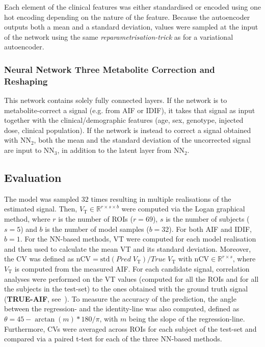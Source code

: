                 Each element of the clinical features was either standardised or encoded using one hot encoding depending on the nature of the feature. Because the autoencoder outputs both a mean and a standard deviation, values were sampled at the input of the network using the same \textit{reparametrisation-trick} as for a variational autoencoder.
            \subsubsection{Neural Network Three Metabolite Correction and Reshaping} \label{sec:a_bayesian_neural_network-based_method_for_the_extraction_of_a_metabolite_corrected_arterial_input_function_from_dynamic_pbr28_pet_appendix_methods_neural_network_design_neural_network_three_metabolite_correction_and_reshaping}
                This network contains solely fully connected layers. If the network is to metabolite-correct a signal (e.g. from \gls{AIF} or \gls{IDIF}), it takes that signal as input together with the clinical/demographic features (age, sex, genotype, injected dose, clinical population).  If the network is instead to correct a signal obtained with \gls{NN}$_2$, both the mean and the standard deviation of the uncorrected signal are input to \gls{NN}$_3$, in addition to the latent layer from \gls{NN}$_2$.
        
        \subsection{Evaluation} \label{sec:a_bayesian_neural_network-based_method_for_the_extraction_of_a_metabolite_corrected_arterial_input_function_from_dynamic_pbr28_pet_appendix_methods_evaluation}
            The model was sampled $32$ times resulting in multiple realisations of the estimated signal. Then, $V_{\mathrm{T}} \in \mathbb{R}^{r \times s \times b}$ were computed via the Logan graphical method, where $r$ is the number of \glspl{ROI} ($r = 69$), $s$ is the number of subjects ($s = 5$) and $b$ is the number of model samples ($b = 32$). For both \gls{AIF} and \gls{IDIF}, $b=1$. For the \gls{NN}-based methods, \gls{VT} were computed for each model realisation and then used to calculate the mean \gls{VT} and its standard deviation. Moreover, the \gls{CV} was defined as $\mathrm{nCV} = \mathrm{std} (Pred \; V_{\mathrm{T}}) / True \; V_{\mathrm{T}}$ with $\mathrm{nCV} \in \mathbb{R}^{r \times s}$, where $V_{\mathrm{T}}$ is computed from the measured \gls{AIF}. For each candidate signal, correlation analyses were performed on the \gls{VT} values (computed for all the \glspl{ROI} and for all the subjects in the test-set) to the ones obtained with the ground truth signal (\textbf{TRUE-\gls{AIF}}, see~). To measure the accuracy of the prediction, the angle between the regression- and the identity-line was also computed, defined as $\theta = 45 - \arctan(m)*180/\pi$, with $m$ being the slope of the regression-line. Furthermore, \glspl{CV} were averaged across \glspl{ROI} for each subject of the test-set and compared via a paired t-test for each of the three \gls{NN}-based methods.

